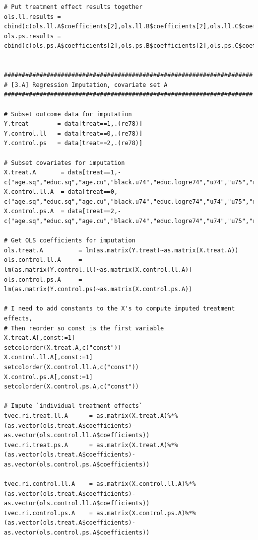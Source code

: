 \documentclass[12pt]{article}
\begin{document}
\begin{verbatim}
# Put treatment effect results together 
ols.ll.results = cbind(c(ols.ll.A$coefficients[2],ols.ll.B$coefficients[2],ols.ll.C$coefficients[2]),c(ols.ll.se.A[2],ols.ll.se.B[2],ols.ll.se.C[2]),c(ols.ll.lower.A[2],ols.ll.lower.B[2],ols.ll.lower.C[2]),c(ols.ll.upper.A[2],ols.ll.upper.B[2],ols.ll.upper.C[2]))
ols.ps.results = cbind(c(ols.ps.A$coefficients[2],ols.ps.B$coefficients[2],ols.ps.C$coefficients[2]),c(ols.ps.se.A[2],ols.ps.se.B[2],ols.ps.se.C[2]),c(ols.ps.lower.A[2],ols.ps.lower.B[2],ols.ps.lower.C[2]),c(ols.ps.upper.A[2],ols.ps.upper.B[2],ols.ps.upper.C[2]))


######################################################################
# [3.A] Regression Imputation, covariate set A
######################################################################

# Subset outcome data for imputation
Y.treat        = data[treat==1,.(re78)]
Y.control.ll   = data[treat==0,.(re78)]
Y.control.ps   = data[treat==2,.(re78)]

# Subset covariates for imputation
X.treat.A       = data[treat==1,-c("age.sq","educ.sq","age.cu","black.u74","educ.logre74","u74","u75","re78","re74","re75","treat")]
X.control.ll.A  = data[treat==0,-c("age.sq","educ.sq","age.cu","black.u74","educ.logre74","u74","u75","re78","re74","re75","treat")]
X.control.ps.A  = data[treat==2,-c("age.sq","educ.sq","age.cu","black.u74","educ.logre74","u74","u75","re78","re74","re75","treat")]

# Get OLS coefficients for imputation
ols.treat.A          = lm(as.matrix(Y.treat)~as.matrix(X.treat.A))
ols.control.ll.A     = lm(as.matrix(Y.control.ll)~as.matrix(X.control.ll.A))
ols.control.ps.A     = lm(as.matrix(Y.control.ps)~as.matrix(X.control.ps.A))

# I need to add constants to the X's to compute imputed treatment effects,
# Then reorder so const is the first variable
X.treat.A[,const:=1]
setcolorder(X.treat.A,c("const"))
X.control.ll.A[,const:=1]
setcolorder(X.control.ll.A,c("const"))
X.control.ps.A[,const:=1]
setcolorder(X.control.ps.A,c("const"))

# Impute `individual treatment effects`
tvec.ri.treat.ll.A      = as.matrix(X.treat.A)%*%(as.vector(ols.treat.A$coefficients)-as.vector(ols.control.ll.A$coefficients))
tvec.ri.treat.ps.A      = as.matrix(X.treat.A)%*%(as.vector(ols.treat.A$coefficients)-as.vector(ols.control.ps.A$coefficients))

tvec.ri.control.ll.A    = as.matrix(X.control.ll.A)%*%(as.vector(ols.treat.A$coefficients)-as.vector(ols.control.ll.A$coefficients))  
tvec.ri.control.ps.A    = as.matrix(X.control.ps.A)%*%(as.vector(ols.treat.A$coefficients)-as.vector(ols.control.ps.A$coefficients))  


\end{verbatim}
\end{document}
